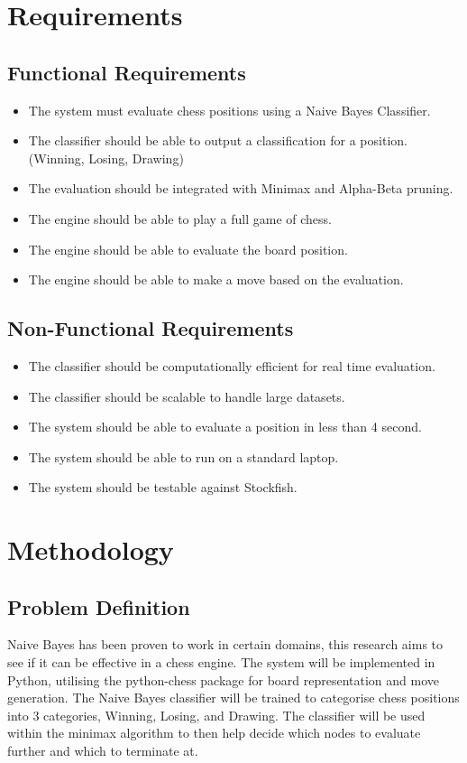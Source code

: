 \documentclass{article}
\begin{document}
\section{Requirements}

\subsection{Functional Requirements}
\label{sec:functional}
\begin{itemize}
    \item The system must evaluate chess positions using a Naive Bayes Classifier.
    \item The classifier should be able to output a classification for a position. (Winning, Losing, Drawing)
    \item The evaluation should be integrated with Minimax and Alpha-Beta pruning.
    \item The engine should be able to play a full game of chess.
    \item The engine should be able to evaluate the board position.
    \item The engine should be able to make a move based on the evaluation.
\end{itemize}

\subsection{Non-Functional Requirements}
\label{sec:nonfunctional}
\begin{itemize}
    \item The classifier should be computationally efficient for real time evaluation.
    \item The classifier should be scalable to handle large datasets.
    \item The system should be able to evaluate a position in less than 4 second.
    \item The system should be able to run on a standard laptop.
    \item The system should be testable against Stockfish.
\end{itemize}




\section{Methodology}
\label{sec:methodolgy}

\subsection{Problem Definition}
\label{sec:problem}
Naive Bayes has been proven to work in certain domains, this research aims to see if it can be 
effective in a chess engine. The system will be implemented in Python, utilising the python-chess package
for board representation and move generation. The Naive Bayes classifier will be trained to categorise
chess positions into 3 categories, Winning, Losing, and Drawing. The classifier will be used within the
minimax algorithm to then help decide which nodes to evaluate further and which to terminate at.
\end{document}
